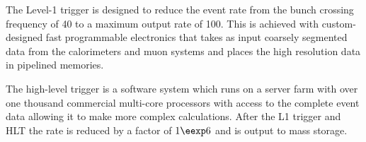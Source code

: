 The Level-1 trigger is designed to reduce the event rate from the bunch
crossing frequency of \unit{40}{\mega\hertz} to a maximum output rate of
\unit{100}{\kilo\hertz}.
This is achieved with custom-designed fast programmable electronics that takes
as input coarsely segmented data from the calorimeters and muon systems and
places the high resolution data in pipelined memories.

The high-level trigger is a software system which runs on a server farm with
over one thousand commercial multi-core processors with access to the complete
event data allowing it to make more complex calculations. After the L1 trigger
and HLT the rate is reduced by a factor of $1 \eexp 6$ and is output to mass
storage.\cite{cms}

